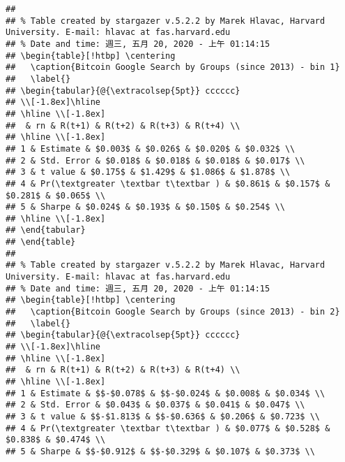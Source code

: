 \documentclass[
]{article}
\begin{document}
\begin{verbatim}
## 
## % Table created by stargazer v.5.2.2 by Marek Hlavac, Harvard University. E-mail: hlavac at fas.harvard.edu
## % Date and time: 週三, 五月 20, 2020 - 上午 01:14:15
## \begin{table}[!htbp] \centering 
##   \caption{Bitcoin Google Search by Groups (since 2013) - bin 1} 
##   \label{} 
## \begin{tabular}{@{\extracolsep{5pt}} cccccc} 
## \\[-1.8ex]\hline 
## \hline \\[-1.8ex] 
##  & rn & R(t+1) & R(t+2) & R(t+3) & R(t+4) \\ 
## \hline \\[-1.8ex] 
## 1 & Estimate & $0.003$ & $0.026$ & $0.020$ & $0.032$ \\ 
## 2 & Std. Error & $0.018$ & $0.018$ & $0.018$ & $0.017$ \\ 
## 3 & t value & $0.175$ & $1.429$ & $1.086$ & $1.878$ \\ 
## 4 & Pr(\textgreater \textbar t\textbar ) & $0.861$ & $0.157$ & $0.281$ & $0.065$ \\ 
## 5 & Sharpe & $0.024$ & $0.193$ & $0.150$ & $0.254$ \\ 
## \hline \\[-1.8ex] 
## \end{tabular} 
## \end{table} 
## 
## % Table created by stargazer v.5.2.2 by Marek Hlavac, Harvard University. E-mail: hlavac at fas.harvard.edu
## % Date and time: 週三, 五月 20, 2020 - 上午 01:14:15
## \begin{table}[!htbp] \centering 
##   \caption{Bitcoin Google Search by Groups (since 2013) - bin 2} 
##   \label{} 
## \begin{tabular}{@{\extracolsep{5pt}} cccccc} 
## \\[-1.8ex]\hline 
## \hline \\[-1.8ex] 
##  & rn & R(t+1) & R(t+2) & R(t+3) & R(t+4) \\ 
## \hline \\[-1.8ex] 
## 1 & Estimate & $$-$0.078$ & $$-$0.024$ & $0.008$ & $0.034$ \\ 
## 2 & Std. Error & $0.043$ & $0.037$ & $0.041$ & $0.047$ \\ 
## 3 & t value & $$-$1.813$ & $$-$0.636$ & $0.206$ & $0.723$ \\ 
## 4 & Pr(\textgreater \textbar t\textbar ) & $0.077$ & $0.528$ & $0.838$ & $0.474$ \\ 
## 5 & Sharpe & $$-$0.912$ & $$-$0.329$ & $0.107$ & $0.373$ \\ 

\end{verbatim}
\end{document}

